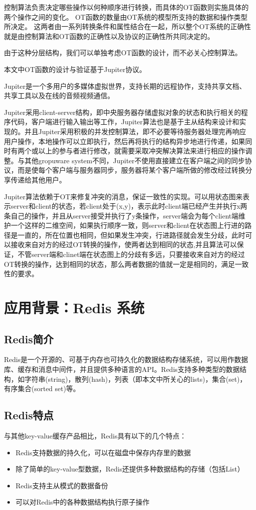 控制算法负责决定哪些操作以何种顺序进行转换，而具体的OT函数则实施具体的两个操作之间的变化。
OT函数的数量由OT系统的模型所支持的数据和操作类型所决定。
这两者由一系列转换条件和属性结合在一起，所以整个OT系统的正确性就是由控制算法和OT函数的正确性以及协议的正确性所共同决定的。

由于这种分层结构，我们可以单独考虑OT函数的设计，而不必关心控制算法。

本文中OT函数的设计与验证基于Jupiter协议\cite{nichols1995high-latency}。

Jupiter是一个多用户的多媒体虚拟世界，支持长期的远程协作，支持共享文档、共享工具以及在线的音频视频通信。

Jupiter采用client-server结构，即中央服务器存储虚拟对象的状态和执行相关的程序代码，客户端进行输入输出等工作，Jupiter算法也是基于主从结构来设计和实现的。并且Jupiter采用积极的并发控制算法，即不必要等待服务器处理完再响应用户操作，本地操作可以立即执行，然后再将执行的结构异步地进行传递，如果同时有两个或以上的参与者进行修改，就需要采取冲突解决算法来进行相应的操作调整。与其他gropuware system不同，Jupiter不使用直接建立在客户端之间的同步协议，而是使每个客户端与服务器同步，服务器将某个客户端所做的修改经过转换分享传递给其他用户。

Jupiter算法依赖于OT来修复冲突的消息，保证一致性的实现。可以用状态图来表示server和client的状态，若client处于(x,y)，表示此时client端已经产生并执行x两条自己的操作，并且从server接受并执行了y条操作，server端会为每个client端维护一个这样的二维空间，如果执行顺序一致，则server和client在状态图上行进的路径是一直的，所在位置也相同，但如果发生冲突，行进路径就会发生分歧，此时可以接收来自对方的经过OT转换的操作，使两者达到相同的状态,并且算法可以保证，不管server端和clinet端在状态图上的分歧有多远，只要接收来自对方的经过OT转换的操作，达到相同的状态，那么两者数据的值就一定是相同的，满足一致性的要求。

\section{应用背景：Redis 系统}
\subsection{Redis简介}
Redis是一个开源的、可基于内存也可持久化的数据结构存储系统，可以用作数据库、缓存和消息中间件，并且提供多种语言的API。Redis支持多种类型的数据结构，如字符串(string)，散列(hash)，列表（即本文中所关心的lists)，集合(set)，有序集合(sorted set)等。
\subsection{Redis特点}
与其他key-value缓存产品相比，Redis具有以下的几个特点：
\begin{itemize}
\item Redis支持数据的持久化，可以在磁盘中保存内存里的数据
\item 除了简单的key-value型数据，Redis还提供多种数据结构的存储（包括List）
\item Redis支持主从模式的数据备份
\item 可以对Redis中的各种数据结构执行原子操作
\end{itemize}
